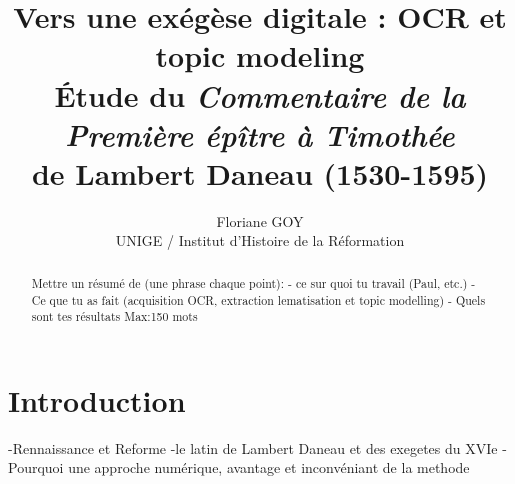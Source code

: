 \documentclass[11pt,french]{article}
\title{Vers une exégèse digitale : OCR et topic modeling \\ Étude du \textit{Commentaire de la Première épître à Timothée} \\ de Lambert Daneau (1530-1595)}
\author{Floriane GOY \\
  UNIGE / Institut d'Histoire de la Réformation \\}
\begin{document}
\maketitle
\begin{abstract}
Mettre un résumé de (une phrase chaque point):
- ce sur quoi tu travail (Paul, etc.)
- Ce que tu as fait (acquisition OCR, extraction lematisation et topic modelling)
- Quels sont tes résultats
Max:150 mots\par

\end{abstract}

\section{Introduction}
-Rennaissance et Reforme 
-le latin de Lambert Daneau et des exegetes du XVIe
-Pourquoi une approche numérique, avantage et inconvéniant de la methode
\end{document}
